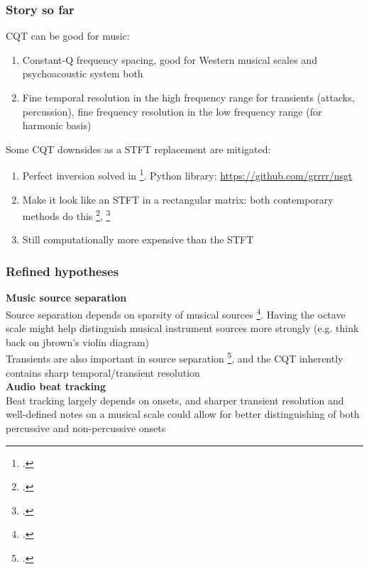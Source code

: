 \documentclass[usenames,dvipsnames]{beamer}
\begin{document}
\begin{frame}
	\frametitle{Story so far}
	CQT can be good for music:
	\begin{enumerate}
		\item
			Constant-Q frequency spacing, good for Western musical scales and psychoacoustic system both
		\item
			Fine temporal resolution in the high frequency range for transients (attacks, percussion), fine frequency resolution in the low frequency range (for harmonic basis)
	\end{enumerate}
	Some CQT downsides as a STFT replacement are mitigated:
	\begin{enumerate}
		\item
			Perfect inversion solved in \footcite{invertiblecqt}. Python library: \href{https://github.com/grrrr/nsgt}{https://github.com/grrrr/nsgt}
		\item
			Make it look like an STFT in a rectangular matrix: both contemporary methods do this \footcite{cqtklapuri}, \footcite{invertiblecqt}
		\item
			Still computationally more expensive than the STFT
	\end{enumerate}
\end{frame}

\begin{frame}
	\frametitle{Refined hypotheses}
	\textbf{Music source separation}\\
	Source separation depends on sparsity of musical sources \footcite{musicsepgood}. Having the octave scale might help distinguish musical instrument sources more strongly (e.g. think back on jbrown's violin diagram)\\
	Transients are also important in source separation \footcite{transientsep}, and the CQT inherently contains sharp temporal/transient resolution\\
	\vspace{1em}
	\textbf{Audio beat tracking}\\
	Beat tracking largely depends on onsets, and sharper transient resolution and well-defined notes on a musical scale could allow for better distinguishing of both percussive and non-percussive onsets
\end{frame}
\end{document}
